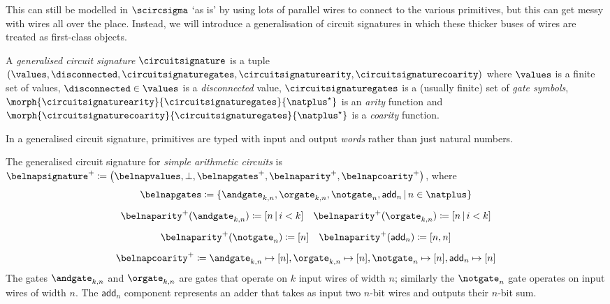 \documentclass{lmcs}
\begin{document}
This can still be modelled in \(\scircsigma\) `as is' by using lots of parallel
wires to connect to the various primitives, but this can get messy with wires
all over the place.
Instead, we will introduce a generalisation of circuit signatures in which these
thicker buses of wires are treated as first-class objects.

\begin{defi}
    A \emph{generalised circuit signature} \(\circuitsignature\) is a tuple \((
    \values,
    \disconnected,
    \circuitsignaturegates,
    \circuitsignaturearity,
    \circuitsignaturecoarity
    )\) where \(\values\) is a finite set of values, \(
    \disconnected \in \values
    \) is a \emph{disconnected} value, \(\circuitsignaturegates\) is a (usually
    finite) set of \emph{gate symbols}, \(
    \morph{\circuitsignaturearity}{\circuitsignaturegates}{\natplus^\star}
    \) is an \emph{arity} function and \(
    \morph{\circuitsignaturecoarity}{\circuitsignaturegates}{\natplus^\star}
    \) is a \emph{coarity} function.
\end{defi}

In a generalised circuit signature, primitives are typed with input and output
\emph{words} rather than just natural numbers.

\begin{exa}
    The generalised circuit signature for \emph{simple arithmetic circuits} is
    \(
    \belnapsignature^+ \coloneqq \left(
    \belnapvalues,
    \bot,
    \belnapgates^+,
    \belnaparity^+,
    \belnapcoarity^+
    \right)
    \), where \begin{gather*}
        \belnapgates
        \coloneqq \{
        \andgate_{k,n},
        \orgate_{k,n},
        \notgate_{n},
        \mathsf{add}_n
        \,|\,
        n \in \natplus
        \}
        \\[0.5em]
        \belnaparity^+(\andgate_{k,n}) \coloneqq [n \,|\, i < k]
        \quad
        \belnaparity^+(\orgate_{k,n}) \coloneqq [n \,|\, i < k]
        \\[0.5em]
        \belnaparity^+(\notgate_{n}) \coloneqq [n]
        \quad
        \belnaparity^+(\mathsf{add}_n) \coloneqq [n,n]
        \\[0.5em]
        \belnapcoarity^+
        \coloneqq
        \andgate_{k,n} \mapsto [n],
        \orgate_{k,n} \mapsto [n],
        \notgate_n \mapsto [n],
        \mathsf{add}_n \mapsto [n]
    \end{gather*}
    The gates \(\andgate_{k,n}\) and \(\orgate_{k,n}\) are gates that operate
    on \(k\) input wires of width \(n\); similarly the \(\notgate_n\) gate
    operates on input wires of width \(n\).
    The \(\mathsf{add}_n\) component represents an adder that takes as input
    two \(n\)-bit wires and outputs their \(n\)-bit sum.
\end{exa}
\end{document}
